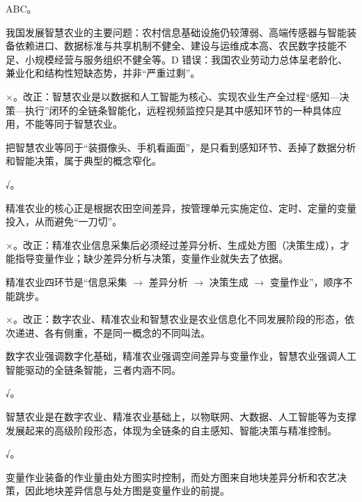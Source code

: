 \documentclass[a4paper,11pt]{article}
\begin{document}
\q ABC。\begin{analysis}我国发展智慧农业的主要问题：农村信息基础设施仍较薄弱、高端传感器与智能装备依赖进口、数据标准与共享机制不健全、建设与运维成本高、农民数字技能不足、小规模经营与服务组织不健全等。D 错误：我国农业劳动力总体呈老龄化、兼业化和结构性短缺态势，并非“严重过剩”。\end{analysis}


\q ×。改正：智慧农业是以数据和人工智能为核心、实现农业生产全过程“感知—决策—执行”闭环的全链条智能化，远程视频监控只是其中感知环节的一种具体应用，不能等同于智慧农业。\begin{analysis}把智慧农业等同于“装摄像头、手机看画面”，是只看到感知环节、丢掉了数据分析和智能决策，属于典型的概念窄化。\end{analysis}

\q √。\begin{analysis}精准农业的核心正是根据农田空间差异，按管理单元实施定位、定时、定量的变量投入，从而避免“一刀切”。\end{analysis}

\q ×。改正：精准农业信息采集后必须经过差异分析、生成处方图（决策生成），才能指导变量作业；缺少差异分析与决策，变量作业就失去了依据。\begin{analysis}精准农业四环节是“信息采集 $\rightarrow$ 差异分析 $\rightarrow$ 决策生成 $\rightarrow$ 变量作业”，顺序不能跳步。\end{analysis}

\q ×。改正：数字农业、精准农业和智慧农业是农业信息化不同发展阶段的形态，依次递进、各有侧重，不是同一概念的不同叫法。\begin{analysis}数字农业强调数字化基础，精准农业强调空间差异与变量作业，智慧农业强调人工智能驱动的全链条智能，三者内涵不同。\end{analysis}

\q √。\begin{analysis}智慧农业是在数字农业、精准农业基础上，以物联网、大数据、人工智能等为支撑发展起来的高级阶段形态，体现为全链条的自主感知、智能决策与精准控制。\end{analysis}

\q √。\begin{analysis}变量作业装备的作业量由处方图实时控制，而处方图来自地块差异分析和农艺决策，因此地块差异信息与处方图是变量作业的前提。\end{analysis}

\end{document}
